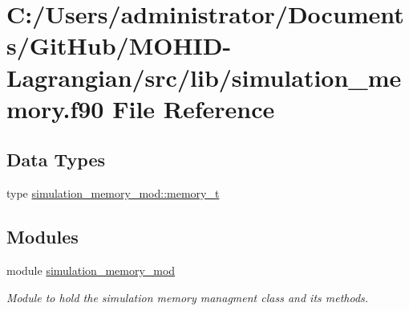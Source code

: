 \hypertarget{simulation__memory_8f90}{}\section{C\+:/\+Users/administrator/\+Documents/\+Git\+Hub/\+M\+O\+H\+I\+D-\/\+Lagrangian/src/lib/simulation\+\_\+memory.f90 File Reference}
\label{simulation__memory_8f90}
\subsection*{Data Types}
\begin{DoxyCompactItemize}
\item 
type \hyperlink{structsimulation__memory__mod_1_1memory__t}{simulation\+\_\+memory\+\_\+mod\+::memory\+\_\+t}
\end{DoxyCompactItemize}
\subsection*{Modules}
\begin{DoxyCompactItemize}
\item 
module \hyperlink{namespacesimulation__memory__mod}{simulation\+\_\+memory\+\_\+mod}
\begin{DoxyCompactList}\small\item\em Module to hold the simulation memory managment class and its methods. \end{DoxyCompactList}\end{DoxyCompactItemize}

